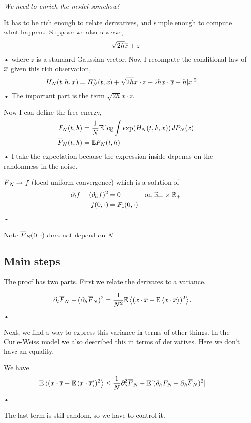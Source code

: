 \emph{We need to enrich the model somehow!}

It has to be rich enough to relate derivatives, and simple enough to compute what happens. Suppose we also observe, %
\begin{align*}
\sqrt{2h}\overline{x} + z
\end{align*}•
where $z$ is a standard Gaussian vector. 
Now I recompute the conditional law of $\overline{x}$ given this rich observation,
\begin{align*}
H_N(t,h,x) &= H_N^\circ (t,x) + \sqrt{2h} x\cdot z  + 2h x\cdot \overline{x} - h|x|^2.
\end{align*}•
The important part is the term $\sqrt{2h} x\cdot z$.

Now I can define the free energy,
\begin{align*}
F_N(t,h) &= \rc N \E\log \int \exp(H_N(t,h,x)) \,dP_N(x)\\
\ol F_N(t,h) &= \E F_N(t,h) %
\end{align*}•
I take the expectation because the expression inside depends on the randomness in the noise.
\begin{thm}
$\overline{F}_N\to f$ (local uniform convergence) which is a solution of 
\begin{align*}
\partial_t f - (\partial_h f)^2 &= 0&\text{on }\mathbb{R}_+\times \mathbb{R}_+\\
f(0,\cdot) &= F_1(0,\cdot)
\end{align*}•
\end{thm}
Note $\overline{F}_N(0,\cdot)$ does not depend on $N$.

\subsection{Main steps}

The proof has two parts. First we relate the derivates to a variance.
\begin{pr}
\begin{align*}
\partial_t \overline{F}_N - (\partial_h\overline{F}_N)^2 &= \frac{1}{N^2} \mathbb{E}\left\langle {(x\cdot \overline{x} - \mathbb{E}\left\langle {x\cdot \overline{x}}\right\rangle)^2}\right\rangle.
\end{align*}•
\end{pr}
Next, we find a way to express this variance in terms of other things. In the Curie-Weiss model we also described this in terms of derivatives. Here we don't have an equality.
\begin{pr}\label{p:me2}
We have
\begin{align*}
\mathbb{E}\left\langle {(x\cdot \overline{x} - \mathbb{E}\left\langle {x\cdot \overline{x}}\right\rangle)^2}\right\rangle
&\le \frac{1}{N} \partial_h^2 \overline{F}_N + \mathbb{E}[(\partial_h F_N- \partial_h \overline{F}_N)^2]
\end{align*}•
\end{pr}
The last term is still random, so we have to control it.

